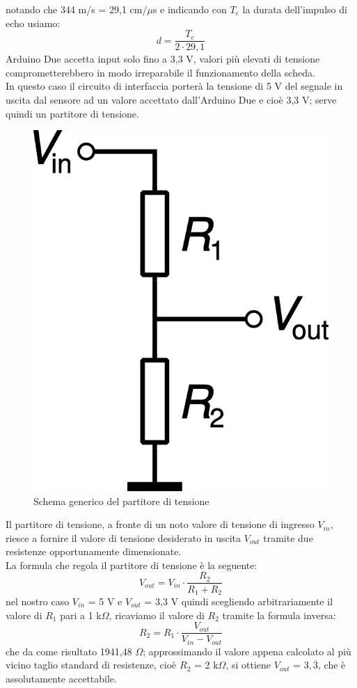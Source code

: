notando che 344 m/s = 29,1 cm/$\mu$s e indicando con $T_e$ la durata dell'impulso 
di echo usiamo:
$$d=\frac{T_e}{2\cdot29,1}$$
Arduino Due accetta input solo fino a 3,3 V, valori più elevati di tensione comprometterebbero in modo 
irreparabile il funzionamento della scheda.\\ 
In questo caso il circuito di interfaccia porterà la tensione di 5 V del segnale in uscita 
dal sensore ad un valore accettato dall'Arduino Due e cioè 3,3 V; serve quindi un 
partitore di tensione.
\begin{figure}[!htb] \center
\includegraphics[scale=0.6]{immagini/Voltage_divider.png}
\caption{Schema generico del partitore di tensione} 
\end{figure}

Il partitore di tensione, a fronte di un noto valore di tensione di ingresso 
$V_{in}$, riesce a fornire il valore di tensione desiderato in uscita $V_{out}$ 
tramite due resistenze opportunamente dimensionate. \\
La formula che regola il partitore di tensione è la seguente:
$$V_{out}=V_{in}\cdot\frac{R_2}{R_1+R_2}$$
nel nostro caso $V_{in}$ = 5 V e $V_{out}$ = 3,3 V quindi scegliendo arbitrariamente 
il valore di $R_1$ pari a 1 k$\Omega$, ricaviamo il valore di $R_2$ tramite 
la formula inversa: $$R_2 = R_1\cdot\frac{V_{out}}{V_{in}-V_{out}}$$
che da come risultato 1941,48 $\Omega$; approssimando il valore appena calcolato
al più vicino taglio standard di resistenze, cioè $R_2 $ = 2 k$\Omega$, si 
ottiene $V_{out}$
 = $3,\overline{3}$, che è assolutamente accettabile.

